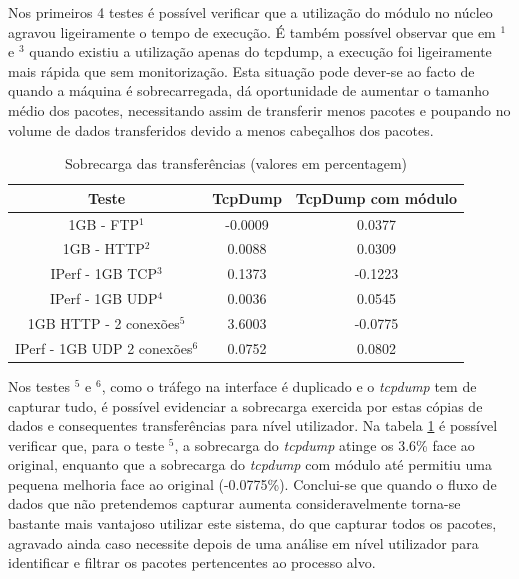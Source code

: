 \documentclass[a4paper]{llncs}
\begin{document}
Nos primeiros 4 testes é possível verificar que a utilização do módulo no núcleo agravou ligeiramente o tempo de execução. É também possível observar que em $^{1}$ e $^{3}$ quando existiu a utilização apenas do tcpdump, a execução foi ligeiramente mais rápida que sem monitorização. Esta situação pode dever-se ao facto de quando a máquina é sobrecarregada, dá oportunidade de aumentar o tamanho médio dos pacotes,  necessitando assim de transferir menos pacotes e poupando no volume de dados transferidos devido a menos cabeçalhos dos pacotes.

\begin{table}
\begin{center}

\begin{tabular}{ | c | c | c |}
\hline
Teste & \hspace {0.3cm} TcpDump \hspace {0.3cm} & TcpDump com módulo  \\

\hline
1GB - FTP$^{1}$ & -0.0009  & 0.0377  \\
1GB - HTTP$^{2}$ & 0.0088 &  0.0309   \\
IPerf - 1GB TCP$^{3}$ & 0.1373 &  -0.1223   \\
IPerf - 1GB UDP$^{4}$ & 0.0036 & 0.0545 \\
\hline
\hline
1GB HTTP - 2 conexões$^{5}$ & 3.6003 & -0.0775   \\
IPerf - 1GB UDP 2 conexões$^{6}$ & 0.0752 & 0.0802   \\
\hline
\end{tabular}
\caption{Sobrecarga das transferências (valores em percentagem)}
\label{tab:overhead}
\end{center}
\end{table}

Nos testes $^{5}$ e $^{6}$, como o tráfego na interface é duplicado e o \textit{tcpdump} tem de capturar tudo, é possível evidenciar a sobrecarga exercida por estas cópias de dados e consequentes transferências para nível utilizador.
 Na tabela \ref{tab:overhead} é possível verificar que, para o teste $^{5}$, a sobrecarga do \textit{tcpdump} atinge os 3.6\% face ao original, enquanto que a sobrecarga do \textit{tcpdump} com módulo até permitiu uma pequena melhoria face ao original (-0.0775\%).
 Conclui-se que quando o fluxo de dados que não pretendemos capturar aumenta consideravelmente torna-se bastante mais vantajoso utilizar este sistema, do que capturar todos os pacotes, agravado ainda caso necessite depois de uma análise em nível utilizador para identificar e filtrar os pacotes pertencentes ao processo alvo.
\end{document}
